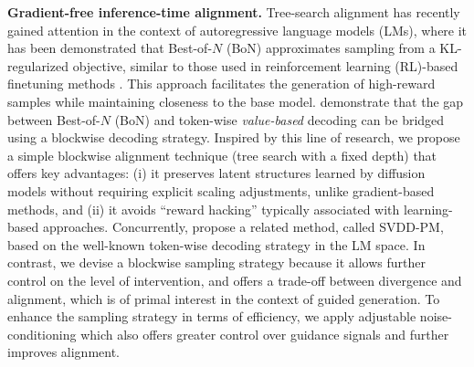 \textbf{Gradient-free inference-time alignment.} Tree-search alignment has recently gained attention in the context of autoregressive language models (LMs), where it has been demonstrated that Best-of-$N$ (BoN) approximates sampling from a KL-regularized objective, similar to those used in reinforcement learning (RL)-based finetuning methods \citep{Gui2024BoNBoNSampling,Beirami2024TheoreticalPolicy,Gao2022ScalingOveroptimization}. This approach facilitates the generation of high-reward samples while maintaining closeness to the base model. \citet{Mudgal2024ControlledModels} demonstrate that the gap between Best-of-$N$ (BoN) and token-wise {\em value-based} decoding \citep{Yang2021FUDGE:Discriminators} can be bridged using a blockwise decoding strategy. Inspired by this line of research, we propose a simple blockwise alignment technique (tree search with a fixed depth) that offers key advantages: (i) it preserves latent structures learned by diffusion models without requiring explicit scaling adjustments, unlike gradient-based methods, and (ii) it avoids ``reward hacking'' typically associated with learning-based approaches. Concurrently, \citet{Li2024Derivative-FreeDecoding} propose a related method, called SVDD-PM, based on the well-known token-wise decoding strategy in the LM space. In contrast, we devise a blockwise sampling strategy because it allows further control on the level of intervention, and offers a trade-off between divergence and alignment, which is of primal interest in the context of guided generation. To enhance the sampling strategy in terms of efficiency, we apply adjustable noise-conditioning which also offers greater control over guidance signals and further improves alignment. 


\vspace{-.1in}
